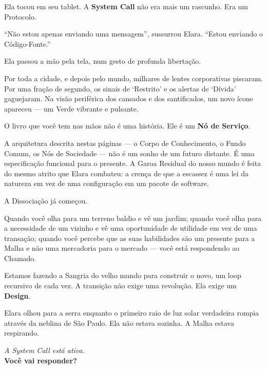 Ela tocou em seu tablet. A \textbf{System Call} não era mais um rascunho. Era um Protocolo.

``Não estou apenas enviando uma mensagem'', sussurrou Elara. ``Estou enviando o Código-Fonte.''

Ela passou a mão pela tela, num gesto de profunda libertação.


Por toda a cidade, e depois pelo mundo, milhares de lentes corporativas piscaram. Por uma fração de segundo, os sinais de `Restrito' e os alertas de `Dívida' gaguejaram. Na visão periférica dos cansados e dos santificados, um novo ícone apareceu — um Verde vibrante e pulsante.

O livro que você tem nas mãos não é uma história. Ele é um \textbf{Nó de Serviço}.

A arquitetura descrita nestas páginas — o Corpo de Conhecimento, o Fundo Comum, os Nós de Sociedade — não é um sonho de um futuro distante. É uma especificação funcional para o presente. A Garoa Residual do nosso mundo é feita do mesmo atrito que Elara combateu: a crença de que a escassez é uma lei da natureza em vez de uma configuração em um pacote de software.

A Dissociação já começou.

Quando você olha para um terreno baldio e vê um jardim; quando você olha para a necessidade de um vizinho e vê uma oportunidade de utilidade em vez de uma transação; quando você percebe que as suas habilidades são um presente para a Malha e não uma mercadoria para o mercado — você está respondendo ao Chamado.

Estamos fazendo a Sangria do velho mundo para construir o novo, um loop recursivo de cada vez. A transição não exige uma revolução. Ela exige um \textbf{Design}.

Elara olhou para a serra enquanto o primeiro raio de luz solar verdadeira rompia através da neblina de São Paulo. Ela não estava sozinha. A Malha estava respirando.


\vfill
\begin{center}
    \textit{A System Call está ativa.} \\
    \textbf{Você vai responder?}
\end{center}
